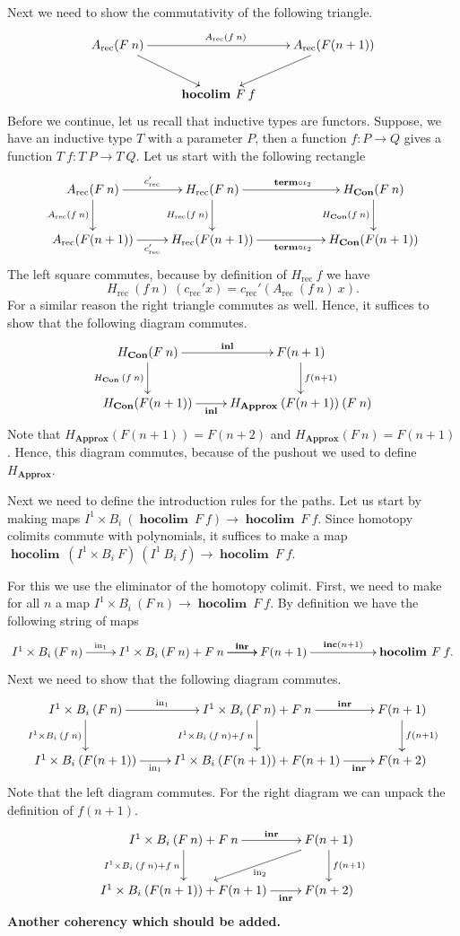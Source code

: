 \documentclass[a4paper,UKenglish]{lipics-v2016}
\newcommand{\inn}{{\rm in}}
\newcommand{\rec}[0]{\operatorname{rec}}
\newcommand{\term}[0]{\textbf{term}}
\newcommand{\Con}[0]{\textbf{Con}}
\newcommand{\Approx}[0]{\textbf{Approx}}
\newcommand{\hocolim}[0]{\operatorname{\textbf{hocolim}}}
\newcommand{\inl}[0]{\operatorname{\textbf{inl}}}
\newcommand{\inr}[0]{\operatorname{\textbf{inr}}}
\newcommand{\inc}[0]{\operatorname{\textbf{inc}}}
\begin{document}
Next we need to show the commutativity of the following triangle.
\[
\xymatrix
{
	A_{\rec}(F \> n) \ar[rr]^{A_{\rec}(f \> n)} \ar[dr] & & A_{\rec}(F(n+1)) \ar[dl] \\
	& \hocolim \> F \> f &
}
\]
Before we continue, let us recall that inductive types are functors.
Suppose, we have an inductive type $T$ with a parameter $P$, then a function $f : P \rightarrow Q$ gives a function $T \> f : T \> P \rightarrow T \> Q$.
Let us start with the following rectangle
\[
\xymatrix
{
	A_{\rec}(F \> n) \ar[r]^-{c_{\rec}'} \ar[d]_{A_{\rec}(f \> n)} 
		& H_{\rec}(F \> n) \ar[rr]^{\term \circ \iota_2} \ar[d]_{H_{\rec}(f \> n)} &
		& H_{\Con}(F \> n) \ar[d]_{H_{\Con}(f \> n)}\\
	A_{\rec}(F(n+1)) \ar[r]_-{c_{\rec}'} 
		& H_{\rec}(F(n+1)) \ar[rr]_{\term \circ \iota_2} &
		& H_{\Con}(F(n+1))
}
\]
The left square commutes, because by definition of $H_{\rec} \> f$ we have
\[
H_{\rec} \>(f \> n) \> (c_{\rec}' x) = c_{\rec}' (A_{\rec} \> (f \> n) \> x).
\]
For a similar reason the right triangle commutes as well.
Hence, it suffices to show that the following diagram commutes.
\[
\xymatrix
{
	H_{\Con}(F \> n) \ar[d]_{H_{\Con} \> (f \> n)} \ar[r]^-{\inl}
		& F(n+1) \ar[d]^{f(n+1)}\\
	H_{\Con}(F(n+1)) \ar[r]_-{\inl}
		& H_{\Approx} \> (F(n+1)) \> (F \> n)
}
\]
Note that $H_{\Approx}(F(n+1)) = F(n+2)$ and $H_{\Approx}(F \> n) = F(n+1)$.
Hence, this diagram commutes, because of the pushout we used to define $H_{\Approx}$.

Next we need to define the introduction rules for the paths.
Let us start by making maps $I^1 \times B_i \> (\hocolim \> F \> f) \rightarrow \hocolim \> F \> f$.
Since homotopy colimits commute with polynomials, it suffices to make a map $\hocolim \> (I^1 \times B_i \> F) \> (I^1 \> B_i \> f)  \rightarrow \hocolim \> F \> f$.

For this we use the eliminator of the homotopy colimit.
First, we need to make for all $n$ a map $I^1 \times B_i \> (F \> n)  \rightarrow \hocolim \> F \> f$.
By definition we have the following string of maps
\[
\xymatrix
{
	I^1 \times B_i \> (F \> n) \ar[r]^-{\inn_1} & I^1 \times B_i \> (F \> n) \ar[r]^-{\inn_1} + F \> n \ar[r]^-{\inr}& F(n+1) \ar[rr]^-{\inc(n+1)} & & \hocolim \> F \> f.
}
\]
Next we need to show that the following diagram commutes.
\[
\xymatrix
{
	I^1 \times B_i \> (F \> n) \ar[r]^-{\inn_1} \ar[d]_{I^1 \times B_i \> (f \> n)} & I^1 \times B_i \> (F \> n) + F \> n \ar[r]^-{\inr} \ar[d]_{I^1 \times B_i \> (f \> n) + f \> n} & F(n+1) \ar[d]^{f(n+1)}\\
	I^1 \times B_i \> (F(n+1)) \ar[r]_-{\inn_1} & I^1 \times B_i \> (F(n+1)) + F(n+1) \ar[r]_-{\inr}& F(n+2) 
}
\]
Note that the left diagram commutes.
For the right diagram we can unpack the definition of $f(n+1)$.
\[
\xymatrix
{
	I^1 \times B_i \> (F \> n) + F \> n \ar[r]^-{\inr} \ar[d]_{I^1 \times B_i \> (f \> n) + f \> n} & F(n+1) \ar[d]^{f(n+1)} \ar[dl]^{\inn_2}\\
	I^1 \times B_i \> (F(n+1)) + F(n+1) \ar[r]_-{\inr}& F(n+2) 
}
\]
\textbf{Another coherency which should be added.}
\end{document}

